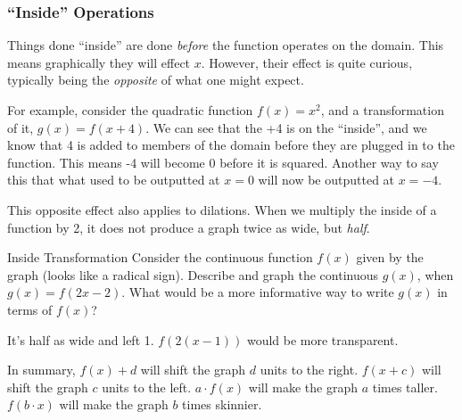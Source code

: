 \subsubsection{``Inside'' Operations}
Things done ``inside'' are done \emph{before} the function operates on the domain.  This means
graphically they will effect $x$.  However, their effect is quite curious, typically being the 
\emph{opposite} of what one might expect.

For example, consider the quadratic function $f(x)=x^2$, and a transformation of it, $g(x)=f(x+4)$.
We can see that the +4 is on the ``inside'', and we know that 4 is added to members of the domain
before they are plugged in to the function.  This means -4 will become 0 before it is squared.
Another way to say this that what used to be outputted at $x=0$ will now be outputted at $x=-4$.

This opposite effect also applies to dilations.  When we multiply the inside of a function by 2, it does
not produce a graph twice as wide, but \emph{half}.



\begin{example}{Inside Transformation}
	\exProblem
Consider the continuous function $f(x)$ given by the graph (looks like a radical sign).
Describe and graph the continuous $g(x)$, when $g(x)=f(2x-2)$.  What would be a more
informative way to write $g(x)$ in terms of $f(x)$?

	\exSolution
It's half as wide and left 1.  $f(2(x-1))$ would be more transparent.
\end{example}

In summary, $f(x) + d$ will shift the graph $d$ units to the right.  $f(x+c)$ will shift the graph
$c$ units to the left.  $a\cdot{}f(x)$ will make the graph $a$ times taller.  $f(b\cdot{}x)$ will
make the graph $b$ times skinnier.

~\vfill
